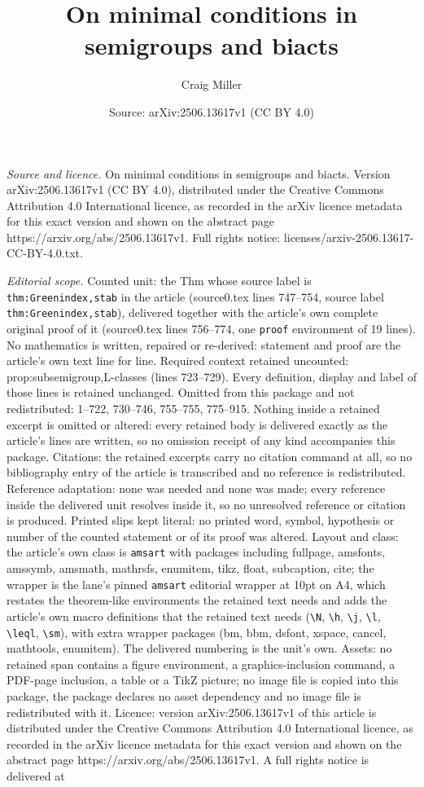\documentclass[10pt,a4paper]{amsart}
\title[On minimal conditions in semigroups and biacts]{On minimal conditions in semigroups and biacts}
\author{Craig Miller}
\date{Source: arXiv:2506.13617v1 (CC BY 4.0)}
\begin{document}
\maketitle

\noindent\emph{Source and licence.} On minimal conditions in semigroups and biacts. Version arXiv:2506.13617v1 (CC BY 4.0), distributed under the Creative Commons Attribution 4.0 International licence, as recorded in the arXiv licence metadata for this exact version and shown on the abstract page https://arxiv.org/abs/2506.13617v1. Full rights notice: licenses/arxiv-2506.13617-CC-BY-4.0.txt.\par\smallskip

\noindent\textit{Editorial scope.} Counted unit: the Thm whose source label is \texttt{thm:Greenindex,stab} in the article (source0.tex lines 747--754, source label \texttt{thm:Greenindex,stab}), delivered together with the article's own complete original proof of it (source0.tex lines 756--774, one \texttt{proof} environment of 19 lines). No mathematics is written, repaired or re-derived: statement and proof are the article's own text line for line. Required context retained uncounted: prop:subsemigroup,L-classes (lines 723--729). Every definition, display and label of those lines is retained unchanged. Omitted from this package and not redistributed: 1--722, 730--746, 755--755, 775--915. Nothing inside a retained excerpt is omitted or altered: every retained body is delivered exactly as the article's lines are written, so no omission receipt of any kind accompanies this package. Citations: the retained excerpts carry no citation command at all, so no bibliography entry of the article is transcribed and no reference is redistributed. Reference adaptation: none was needed and none was made; every reference inside the delivered unit resolves inside it, so no unresolved reference or citation is produced. Printed slips kept literal: no printed word, symbol, hypothesis or number of the counted statement or of its proof was altered. Layout and class: the article's own class is \texttt{amsart} with packages including fullpage, amsfonts, amssymb, amsmath, mathrsfs, enumitem, tikz, float, subcaption, cite; the wrapper is the lane's pinned \texttt{amsart} editorial wrapper at 10pt on A4, which restates the theorem-like environments the retained text needs and adds the article's own macro definitions that the retained text needs (\texttt{\textbackslash N}, \texttt{\textbackslash h}, \texttt{\textbackslash j}, \texttt{\textbackslash l}, \texttt{\textbackslash leql}, \texttt{\textbackslash sm}), with extra wrapper packages (bm, bbm, dsfont, xspace, cancel, mathtools, enumitem). The delivered numbering is the unit's own. Assets: no retained span contains a figure environment, a graphics-inclusion command, a PDF-page inclusion, a table or a TikZ picture; no image file is copied into this package, the package declares no asset dependency and no image file is redistributed with it. Licence: version arXiv:2506.13617v1 of this article is distributed under the Creative Commons Attribution 4.0 International licence, as recorded in the arXiv licence metadata for this exact version and shown on the abstract page https://arxiv.org/abs/2506.13617v1. A full rights notice is delivered at 
\end{document}
